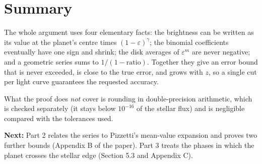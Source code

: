 \documentclass[11pt,a4paper]{article}
\theoremstyle{remark}
\begin{document}
\section{Summary}

The whole argument uses four elementary facts: the brightness can be written as its value at the
planet's centre times $(1-\varepsilon)^\gamma$; the binomial coefficients eventually have one sign
and shrink; the disk averages of $\varepsilon^m$ are never negative; and a geometric series sums to
$1/(1-\text{ratio})$. Together they give an error bound that is never exceeded, is close to the
true error, and grows with $z$, so a single cut per light curve guarantees the requested accuracy.

What the proof does \emph{not} cover is rounding in double-precision arithmetic, which is checked
separately (it stays below $10^{-16}$ of the stellar flux) and is negligible compared with the
tolerances used.

\medskip\noindent\textbf{Next:} Part 2 relates the series to Pizzetti's mean-value expansion and
proves two further bounds (Appendix B of the paper). Part 3 treats the phases in which the
planet crosses the stellar edge (Section 5.3 and Appendix C).
\end{document}
